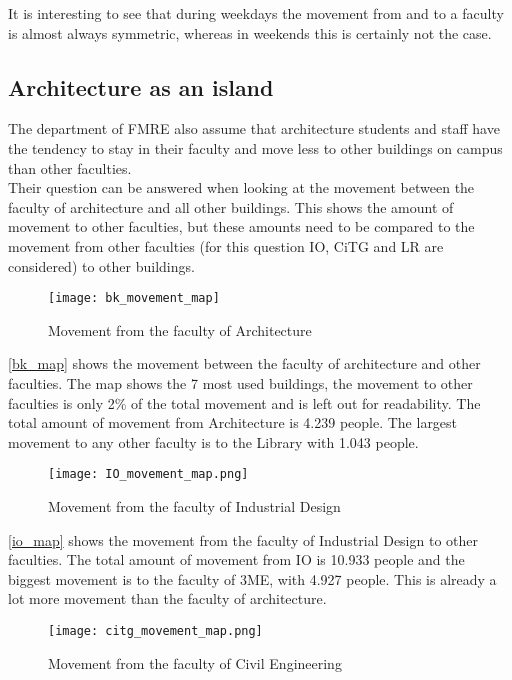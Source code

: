 It is interesting to see that during weekdays the movement from and to a faculty is almost always symmetric, whereas in weekends this is certainly not the case. 

\subsection{Architecture as an island}
The department of FMRE also assume that architecture students and staff have the tendency to stay in their faculty and move less to other buildings on campus than other faculties. \\
Their question can be answered when looking at the movement between the faculty of architecture and all other buildings. This shows the amount of movement to other faculties, but these amounts need to be compared to the movement from other faculties (for this question IO, CiTG and LR are considered) to other buildings. \\

\begin{figure}[H]
\centering
\texttt{[image: bk\_movement\_map]}
\captionsetup{justification=centering}
\caption{Movement from the faculty of Architecture}
\label{bk_map}
\end{figure} 

\autoref{bk_map} shows the movement between the faculty of architecture and other faculties. The map shows the 7 most used buildings, the movement to other faculties is only 2\% of the total movement and is left out for readability. The total amount of movement from Architecture is 4.239 people. The largest movement to any other faculty is to the Library with 1.043 people. \\

\begin{figure}[H]
\centering
\texttt{[image: IO\_movement\_map.png]}
\captionsetup{justification=centering}
\caption{Movement from the faculty of Industrial Design}
\label{io_map}
\end{figure} 

\autoref{io_map} shows the movement from the faculty of Industrial Design to other faculties. The total amount of movement from IO is 10.933 people and the biggest movement is to the faculty of 3ME, with 4.927 people. This is already a lot more movement than the faculty of architecture.\\

\begin{figure}[H]
\centering
\texttt{[image: citg\_movement\_map.png]}
\captionsetup{justification=centering}
\caption{Movement from the faculty of Civil Engineering}
\label{citg_map}
\end{figure} 

